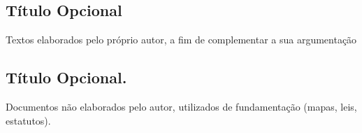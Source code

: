 \documentclass[
	12pt,				%
	openright,			%
	oneside,			%
	a4paper,			%
	english,			%
	brazil				%
	]{abntex2}
\begin{document}













\postextual




\begin{apendicesenv}

\chapter{Título Opcional}
Textos elaborados pelo próprio autor, a fim de complementar a sua argumentação

\end{apendicesenv}



\begin{anexosenv}

\chapter{Título Opcional.}
Documentos não elaborados pelo autor, utilizados de fundamentação (mapas, leis, estatutos).

\end{anexosenv}

\printindex
\end{document}
